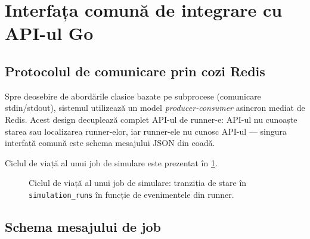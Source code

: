 \section{Interfața comună de integrare cu API-ul Go}
\label{sec:interfata_integrare}

\subsection{Protocolul de comunicare prin cozi Redis}
\label{subsec:protocol_redis}

Spre deosebire de abordările clasice bazate pe subprocese (comunicare
stdin/stdout), sistemul utilizează un model \emph{producer-consumer} asincron
mediat de Redis. Acest design decuplează complet API-ul de runner-e:
API-ul nu cunoaște starea sau localizarea runner-elor, iar runner-ele nu
cunosc API-ul --- singura interfață comună este schema mesajului JSON din coadă.

Ciclul de viață al unui job de simulare este prezentat în
\cref{fig:job_lifecycle}.

\begin{figure}[htbp]
\centering
{}
\caption{Ciclul de viață al unui job de simulare: tranziția de stare în
\texttt{simulation\_runs} în funcție de evenimentele din runner.}
\label{fig:job_lifecycle}
\end{figure}

\subsection{Schema mesajului de job}
\label{subsec:job_schema}

